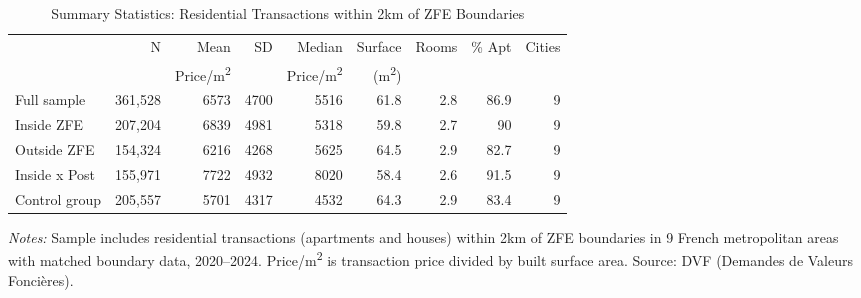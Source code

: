 \begin{table}[htbp]
\centering
\caption{Summary Statistics: Residential Transactions within 2km of ZFE Boundaries}
\label{tab:summary}
\begin{adjustbox}{max width=\textwidth}
\begin{tabular}{lrrrrrrrr}
\hline\hline
 & N & Mean & SD & Median & Surface & Rooms & \% Apt & Cities \\
 & & Price/m\textsuperscript{2} & & Price/m\textsuperscript{2} & (m\textsuperscript{2}) & & & \\
\hline
Full sample  &  361,528  &  6573  &  4700  &  5516  &  61.8  &  2.8  &  86.9  &  9  \\
Inside ZFE  &  207,204  &  6839  &  4981  &  5318  &  59.8  &  2.7  &  90  &  9  \\
Outside ZFE  &  154,324  &  6216  &  4268  &  5625  &  64.5  &  2.9  &  82.7  &  9  \\
Inside x Post  &  155,971  &  7722  &  4932  &  8020  &  58.4  &  2.6  &  91.5  &  9  \\
Control group  &  205,557  &  5701  &  4317  &  4532  &  64.3  &  2.9  &  83.4  &  9  \\
\hline\hline
\end{tabular}
\end{adjustbox}
\begin{tablenotes}[flushleft]
\small \textit{Notes:} Sample includes residential transactions (apartments and houses) within 2km of ZFE boundaries in 9 French metropolitan areas with matched boundary data, 2020--2024. Price/m\textsuperscript{2} is transaction price divided by built surface area. Source: DVF (Demandes de Valeurs Fonci\`eres).
\end{tablenotes}
\end{table}
